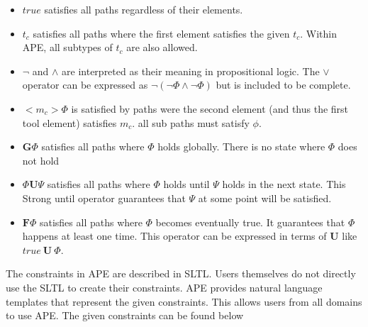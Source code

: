 \documentclass{article}
\begin{document}
\begin{itemize}
    \item $true$ satisfies all paths regardless of their elements.
    \item $t_c$ satisfies all paths where the first element satisfies the given $t_c$. Within APE, all subtypes of $t_c$ are also allowed.
    \item $\neg$ and $\wedge$ are interpreted as their meaning in propositional logic. The $\vee$ operator can be expressed as $\neg(\neg \Phi \wedge \neg \Phi)$ but is included to be complete.
    
    \item $<m_c> \Phi$ is satisfied by paths were the second element (and thus the first tool element) satisfies $m_c$. all sub paths must satisfy $\phi$.
    
    \item $\textbf{G}\Phi$ satisfies all paths where $\Phi$ holds globally. There is no state where $\Phi$ does not hold
    \item $\Phi \textbf{U} \Psi$ satisfies all paths where $\Phi$ holds until $\Psi$ holds in the next state. This Strong until operator guarantees that $\Psi$ at some point will be satisfied. 
    \item $\textbf{F}\Phi$ satisfies all paths where $\Phi$ becomes eventually true. It guarantees that $\Phi$ happens at least one time. This operator can be expressed in terms of \textbf{U} like $true\ \textbf{U}\ \Phi$.
    
\end{itemize}

The constraints in APE are described in SLTL. Users themselves do not directly use the SLTL to create their constraints. APE provides natural language templates that represent the given constraints. This allows users from all domains to use APE. The given constraints can be found below\\
\end{document}

